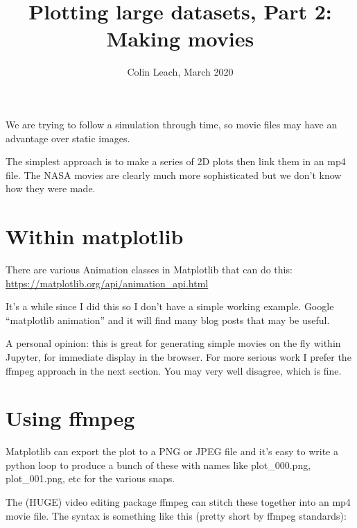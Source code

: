 

\setlength{\parskip}{0.2em}
\setlength{\skip\footins}{20pt}

\title{Plotting large datasets, Part 2: Making movies}
\author{Colin Leach, March 2020}
\date{\vspace{-3ex}}



	
\maketitle

We are trying to follow a simulation through time, so movie files may have an advantage over static images.

The simplest approach is to make a series of 2D plots then link them in an mp4 file. The NASA movies are clearly much more sophisticated but we don't know how they were made.

\section{Within matplotlib}

There are various Animation classes in Matplotlib that can do this: 
\url{https://matplotlib.org/api/animation_api.html}

It's a while since I did this so I don't have a simple working example. Google ``matplotlib animation'' and it will find many blog posts that may be useful.

A personal opinion: this is great for generating simple movies on the fly within Jupyter, for immediate display in the browser. For more serious work I prefer the ffmpeg approach in the next section. You may very well disagree, which is fine.

\section{Using ffmpeg}

Matplotlib can export the plot to a PNG or JPEG file and it's easy to write a python loop to produce a bunch of these with names like plot\_000.png, plot\_001.png, etc for the various snaps.

The (HUGE) video editing package ffmpeg can stitch these together into an mp4 movie file. The syntax is something like this (pretty short by ffmpeg standards):

